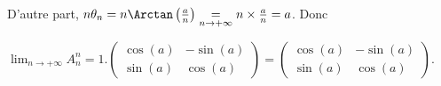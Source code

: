 {{D'autre part, $n\theta_n=n\Arctan\left( \frac{a}{n}\right)\underset{n\rightarrow+\infty}{=}n\times \frac{a}{n}=a$. Donc

\begin{center}
$\lim_{n \rightarrow +\infty}A_n^n=1.\left(
\begin{array}{cc}
\cos(a)&-\sin(a)\\
\sin(a)&\cos(a)
\end{array}
\right)=\left(
\begin{array}{cc}
\cos(a)&-\sin(a)\\
\sin(a)&\cos(a)
\end{array}
\right)$.
\end{center}

\begin{center}
\end{center}}
}